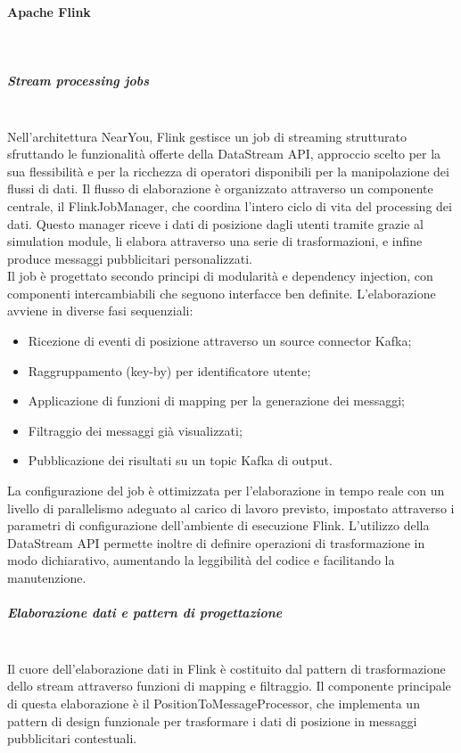 \documentclass[10pt]{article}
\newcommand{\myparagraph}[1]{\paragraph{#1}\mbox{}\\}
\newcommand{\mysubparagraph}[1]{\subparagraph{#1}\mbox{}\\}
\begin{document}
        \myparagraph{Apache Flink}
        \mysubparagraph{Stream processing jobs}
        Nell'architettura NearYou, Flink gestisce un job di streaming strutturato sfruttando le funzionalità offerte della DataStream API,
        approccio scelto per la sua flessibilità e per la ricchezza di operatori disponibili per la manipolazione dei flussi di dati.
        Il flusso di elaborazione è organizzato attraverso un componente centrale, il FlinkJobManager, che coordina l'intero ciclo di vita del processing dei dati.
        Questo manager riceve i dati di posizione dagli utenti tramite grazie al simulation module, li elabora attraverso una serie di trasformazioni, e infine produce messaggi pubblicitari personalizzati. \\
        Il job è progettato secondo principi di modularità e dependency injection, con componenti intercambiabili che seguono interfacce ben definite.
        L'elaborazione avviene in diverse fasi sequenziali:

        \begin{itemize}
            \item Ricezione di eventi di posizione attraverso un source connector Kafka;
            \item Raggruppamento (key-by) per identificatore utente;
            \item Applicazione di funzioni di mapping per la generazione dei messaggi;
            \item Filtraggio dei messaggi già visualizzati;
            \item Pubblicazione dei risultati su un topic Kafka di output.
        \end{itemize}

        La configurazione del job è ottimizzata per l'elaborazione in tempo reale con un livello di parallelismo adeguato al carico di lavoro previsto, impostato attraverso i parametri di configurazione dell'ambiente di esecuzione Flink.
        L'utilizzo della DataStream API permette inoltre di definire operazioni di trasformazione in modo dichiarativo, aumentando la leggibilità del codice e facilitando la manutenzione.

        \mysubparagraph{Elaborazione dati e pattern di progettazione}
        Il cuore dell'elaborazione dati in Flink è costituito dal pattern di trasformazione dello stream attraverso funzioni di mapping e filtraggio.
        Il componente principale di questa elaborazione è il PositionToMessageProcessor, che implementa un pattern di design funzionale per trasformare i dati di posizione in messaggi pubblicitari contestuali.
\end{document}
